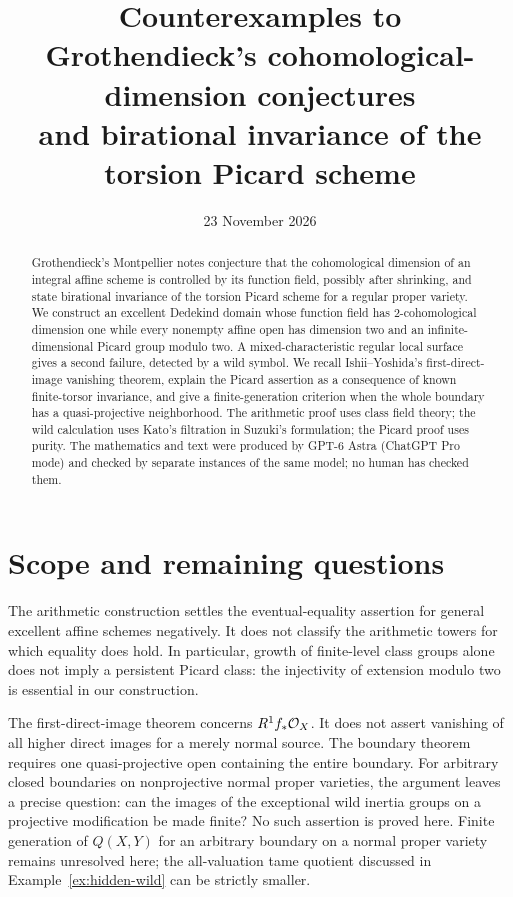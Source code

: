 \documentclass[11pt,a4paper]{article}
\title{Counterexamples to Grothendieck's cohomological-dimension conjectures\protect\\
and birational invariance of the torsion Picard scheme}
\author{}
\date{23 November 2026}
\theoremstyle{definition}\newtheorem{definition}[theorem]{Definition}
\theoremstyle{remark}\newtheorem{remark}[theorem]{Remark}
\begin{document}
\maketitle
\begin{abstract}
Grothendieck's Montpellier notes conjecture that the cohomological dimension
of an integral affine scheme is controlled by its function field, possibly
after shrinking, and state birational invariance of the torsion Picard
scheme for a regular proper variety. We construct
an excellent Dedekind domain whose function field has $2$-cohomological
dimension one while every nonempty affine open has dimension two and an
infinite-dimensional Picard group modulo two. A mixed-characteristic
regular local surface gives a second failure, detected by a wild symbol.
We recall Ishii--Yoshida's first-direct-image vanishing theorem, explain
the Picard assertion as a consequence of known finite-torsor invariance,
and give a finite-generation
criterion when the whole boundary has a quasi-projective neighborhood.
The arithmetic proof uses class field theory; the wild calculation uses
Kato's filtration in Suzuki's formulation; the Picard proof uses purity.
The mathematics and text were produced by GPT-6 Astra (ChatGPT Pro mode)
and checked by separate instances of the same model; no human has checked them.
\end{abstract}





\section{Scope and remaining questions}
The arithmetic construction settles the eventual-equality assertion for
general excellent affine schemes negatively. It does not classify the
arithmetic towers for which equality does hold. In particular, growth of
finite-level class groups alone does not imply a persistent Picard class:
the injectivity of extension modulo two is essential in our construction.

The first-direct-image theorem concerns $R^1f_*\mathcal O_X$. It does not assert
vanishing of all higher direct images for a merely normal source. The
boundary theorem requires one quasi-projective open containing the
entire boundary. For arbitrary closed boundaries on nonprojective normal
proper varieties, the argument leaves a precise question: can the images
of the exceptional wild inertia groups on a projective modification be
made finite? No such assertion is proved here. Finite generation of
$Q(X,Y)$ for an arbitrary boundary on a normal proper variety remains
unresolved here; the all-valuation tame quotient discussed in
Example~\ref{ex:hidden-wild} can be strictly smaller.
\end{document}
